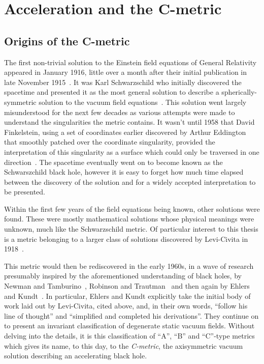 \documentclass[
twoside,
openright,
frontopenright,
]{dmathesis}
\begin{document}
\chapter{Acceleration and the C-metric}
\label{chap:cmet}

\section{Origins of the C-metric}
\label{sec:cmet-history}

The first non-trivial solution to the Einstein field equations of General
Relativity appeared in January 1916, little over a month after their initial
publication in late November 1915~\cite{Einstein:1915aa,Einstein:1916aa}. It was
Karl Schwarzschild who initially discovered the spacetime and presented it as
the most general solution to describe a spherically-symmetric solution to the
vacuum field equations~\cite{Schwarzschild:1916ab, Schwarzschild:1916aa,
  Schwarzschild:1916ea}. This solution went largely misunderstood for the next
few decades as various attempts were made to understand the singularities the
metric contains. It wasn't until 1958 that David Finkelstein, using a set of
coordinates earlier discovered by Arthur Eddington that smoothly patched over the
coordinate singularity, provided the interpretation of this singularity as a
surface which could only be traversed in one
direction~\cite{Finkelstein:1958aa}. The spacetime eventually went on to become
known as the Schwarszchild black hole, however it is easy to forget how much
time elapsed between the discovery of the solution and for a widely accepted
interpretation to be presented.

Within the first few years of the field equations being known, other solutions
were found. These were mostly mathematical solutions whose physical meanings
were unknown, much like the Schwarzschild metric. Of particular interest to this
thesis is a metric belonging to a larger class of solutions discovered by
Levi-Civita in 1918~\cite{Levi-Civita:1918aa}.

This metric would then be rediscovered in the early 1960s, in a wave of research
presumably inspired by the aforementioned understanding of black holes, by
Newman and Tamburino~\cite{Newman:1961aa}, Robinson and
Trautman~\cite{Robinson:1962zz} and then again by Ehlers and
Kundt~\cite{Ehlers:1962aa}. In particular, Ehlers and Kundt explicitly take the
initial body of work laid out by Levi-Civita, cited above, and, in their own
words, ``follow his line of thought'' and ``simplified and completed his
derivations''. They continue on to present an invariant classification of
degenerate static vacuum fields. Without delving into the details, it is this
classification of ``A'', ``B'' and ``C''-type metrics which gives its name, to
this day, to the \emph{C-metric}, the axisymmetric vacuum solution describing an
accelerating black hole.
\end{document}
